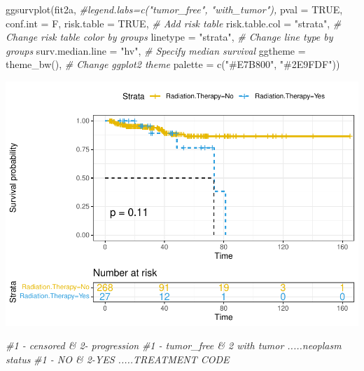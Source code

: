 \documentclass[
  11pt,
]{article}
\newenvironment{Shaded}{\begin{snugshade}}{\end{snugshade}}
\newcommand{\AttributeTok}[1]{\textcolor[rgb]{0.77,0.63,0.00}{#1}}
\newcommand{\CommentTok}[1]{\textcolor[rgb]{0.56,0.35,0.01}{\textit{#1}}}
\newcommand{\ConstantTok}[1]{\textcolor[rgb]{0.00,0.00,0.00}{#1}}
\newcommand{\FunctionTok}[1]{\textcolor[rgb]{0.00,0.00,0.00}{#1}}
\newcommand{\NormalTok}[1]{#1}
\newcommand{\StringTok}[1]{\textcolor[rgb]{0.31,0.60,0.02}{#1}}
\begin{document}
\begin{Shaded}
\begin{Highlighting}[]
\FunctionTok{ggsurvplot}\NormalTok{(fit2a,}
          \CommentTok{\#legend.labs=c("tumor\_free", "with\_tumor"),}
          \AttributeTok{pval =} \ConstantTok{TRUE}\NormalTok{, }\AttributeTok{conf.int =}\NormalTok{ F,}
          \AttributeTok{risk.table =} \ConstantTok{TRUE}\NormalTok{, }\CommentTok{\# Add risk table}
          \AttributeTok{risk.table.col =} \StringTok{"strata"}\NormalTok{, }\CommentTok{\# Change risk table color by groups}
          \AttributeTok{linetype =} \StringTok{"strata"}\NormalTok{, }\CommentTok{\# Change line type by groups}
          \AttributeTok{surv.median.line =} \StringTok{"hv"}\NormalTok{, }\CommentTok{\# Specify median survival}
          \AttributeTok{ggtheme =} \FunctionTok{theme\_bw}\NormalTok{(), }\CommentTok{\# Change ggplot2 theme}
          \AttributeTok{palette =} \FunctionTok{c}\NormalTok{(}\StringTok{"\#E7B800"}\NormalTok{, }\StringTok{"\#2E9FDF"}\NormalTok{))}
\end{Highlighting}
\end{Shaded}

\includegraphics{new_surv_3_files/figure-latex/unnamed-chunk-6-1.pdf}

\begin{Shaded}
\begin{Highlighting}[]
\CommentTok{\#1 {-} censored \& 2{-} progression}
\CommentTok{\#1 {-} tumor\_free \& 2 with tumor .....neoplasm status }
\CommentTok{\#1 {-} NO \& 2{-}YES .....TREATMENT CODE}
\end{Highlighting}
\end{Shaded}
\end{document}
